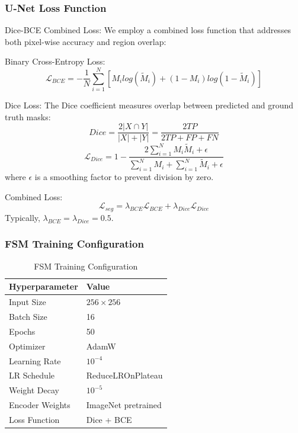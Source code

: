 \documentclass[runningheads]{llncs}
\begin{document}
\subsubsection{U-Net Loss Function}
Dice-BCE Combined Loss: We employ a combined loss function that addresses both pixel-wise accuracy and region overlap:

\noindent Binary Cross-Entropy Loss:
\begin{equation}
\mathcal{L}_{BCE}=-\frac{1}{N}\sum_{i=1}^{N}[M_{i}log(\tilde{M}_{i})+(1-M_{i})log(1-\tilde{M}_{i})]
\end{equation}

\noindent Dice Loss: The Dice coefficient measures overlap between predicted and ground truth masks:
\begin{equation}
Dice=\frac{2|X\cap Y|}{|X|+|Y|}=\frac{2TP}{2TP+FP+FN}
\end{equation}
\begin{equation}
\mathcal{L}_{Dice}=1-\frac{2\sum_{i=1}^{N}M_{i}\tilde{M}_{i}+\epsilon}{\sum_{i=1}^{N}M_{i}+\sum_{i=1}^{N}\tilde{M}_{i}+\epsilon}
\end{equation}
where $\epsilon$ is a smoothing factor to prevent division by zero.

\noindent Combined Loss:
\begin{equation}
\mathcal{L}_{seg}=\lambda_{BCE}\mathcal{L}_{BCE}+\lambda_{Dice}\mathcal{L}_{Dice}
\end{equation}
Typically, $\lambda_{BCE}=\lambda_{Dice}=0.5$.

\subsubsection{FSM Training Configuration}
\begin{table}[H]
\caption{FSM Training Configuration}
\label{tab:fsm_config}
\centering
\begin{tabular}{ll}
\toprule
\textbf{Hyperparameter} & \textbf{Value} \\
\midrule
Input Size & $256\times256$ \\
Batch Size & 16 \\
Epochs & 50 \\
Optimizer & AdamW \\
Learning Rate & $10^{-4}$ \\
LR Schedule & ReduceLROnPlateau \\
Weight Decay & $10^{-5}$ \\
Encoder Weights & ImageNet pretrained \\
Loss Function & Dice + BCE \\
\bottomrule
\end{tabular}
\end{table}
\end{document}

